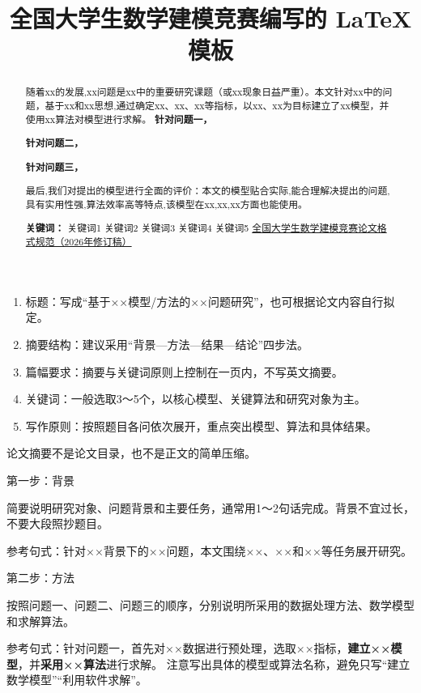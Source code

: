\documentclass{cumcmthesis}
\title{全国大学生数学建模竞赛编写的 \LaTeX{} 模板}
\begin{document}
 \maketitle  %
 \begin{abstract}
随着xx的发展,xx问题是xx中的重要研究课题（或xx现象日益严重）。本文针对xx中的问题，基于xx和xx思想,通过确定xx、xx、xx等指标，以xx、xx为目标建立了xx模型，并使用xx算法对模型进行求解。
\textbf{针对问题一，}

\textbf{针对问题二，}

\textbf{针对问题三，}


最后,我们对提出的模型进行全面的评价：本文的模型贴合实际,能合理解决提出的问题,具有实用性强,算法效率高等特点,该模型在xx,xx,xx方面也能使用。

\textbf{关键词： }关键词1  关键词2  关键词3  关键词4  关键词5
\href{https://www.mcm.edu.cn/html_cn/node/4cd596519c9eb9fbd866398f6df0caa3.html}{全国大学生数学建模竞赛论文格式规范（2026年修订稿）}

\end{abstract}


\begin{enumerate} 
\item 标题：写成“基于××模型/方法的××问题研究”，也可根据论文内容自行拟定。
\item 摘要结构：建议采用“背景—方法—结果—结论”四步法。
\item 篇幅要求：摘要与关键词原则上控制在一页内，不写英文摘要。
\item 关键词：一般选取3～5个，以核心模型、关键算法和研究对象为主。
\item 写作原则：按照题目各问依次展开，重点突出模型、算法和具体结果。
\end{enumerate}

论文摘要不是论文目录，也不是正文的简单压缩。

第一步：背景

简要说明研究对象、问题背景和主要任务，通常用1～2句话完成。背景不宜过长，不要大段照抄题目。

参考句式：针对××背景下的××问题，本文围绕××、××和××等任务展开研究。

第二步：方法

按照问题一、问题二、问题三的顺序，分别说明所采用的数据处理方法、数学模型和求解算法。

参考句式：针对问题一，首先对××数据进行预处理，选取××指标，\textbf{建立××模型}，并\textbf{采用××算法}进行求解。
注意写出具体的模型或算法名称，避免只写“建立数学模型”“利用软件求解”。
\end{document}
